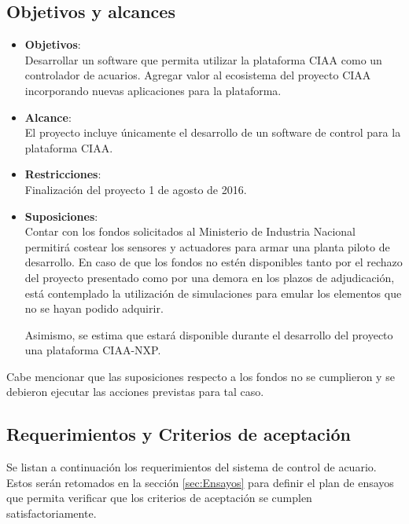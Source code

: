 \subsection{Objetivos y alcances}
\label{sec:Objetivos}
\begin{itemize}

	\item \textbf{Objetivos}:\\
	Desarrollar un software que permita utilizar la plataforma CIAA como un controlador de acuarios. Agregar valor al ecosistema del proyecto CIAA incorporando nuevas aplicaciones para la plataforma.
	
	\item \textbf{Alcance}:\\
	El proyecto incluye únicamente el desarrollo de un software de control para la plataforma CIAA.

	\item \textbf{Restricciones}:\\
	Finalización del proyecto 1 de agosto de 2016.

	\item \textbf{Suposiciones}:\\
	Contar con los fondos solicitados al Ministerio de Industria Nacional permitirá costear los sensores y actuadores para armar una planta piloto de desarrollo.  En caso de que los fondos no estén disponibles tanto por el rechazo del proyecto presentado como por una demora en los plazos de adjudicación, está contemplado la utilización de simulaciones para emular los elementos que no se hayan podido adquirir.
	
	Asimismo, se estima que estará disponible durante el desarrollo del proyecto una plataforma CIAA-NXP.
	
	\end{itemize}
	
Cabe mencionar que las suposiciones respecto a los fondos no se cumplieron y se debieron ejecutar las acciones previstas para tal caso.

  

\clearpage
\subsection{Requerimientos y Criterios de aceptación}
\label{sec:Requerimientos}

Se listan a continuación los requerimientos del sistema de control de acuario. Estos serán retomados en la sección \ref{sec:Ensayos} para definir el plan de ensayos que permita verificar que los criterios de aceptación se cumplen satisfactoriamente.
 
